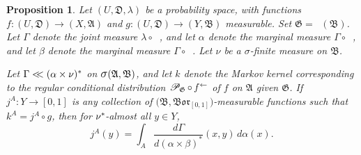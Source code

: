 \documentclass[
twoside=true,
paper=letter,
fontsize=9pt,
pagesize=auto,
leqno,
openany,
headsepline,
overfullrule,
]{scrbook}
\theoremstyle{plain}
\theoremstyle{plain}
\newtheorem{prop}[thm]{Proposition}
\theoremstyle{definition}
\theoremstyle{bfnoteitalic}
\theoremstyle{bfnoteroman}
\newcommand{\sigalg}[1]{\mathfrak{#1}}
\newcommand{\cali}[1]{\mathscr{#1}}
\newcommand{\condprobop}[1]{\mathop{\cali{P}\hspace{-1pt}}\nolimits_{#1}}
\newcommand{\borel}{\mathfrak{Bor}}
\newcommand{\sagb}{\mathop{\hbox{\large{$\sigma$}}}\nolimits}
\newcommand{\textsigma}{\hbox{\large{$\sigma$}}\kern-1pt}
\newcommand{\preimage}[1]{\mathop{#1^{\leftarrow}}}
\newcommand{\sigmaalgebra}{\sigalg{A}}
\newcommand{\sigmaalgebraii}{\sigalg{B}}
\newcommand{\productsig}[2]{\sagb(#1,#2)}
\newcommand{\kernast}{\ast\kern-1pt}
\newcommand{\funcf}{f}
\newcommand{\funcg}{g}
\newcommand{\funcj}{j}
\newcommand{\funck}{k}
\newcommand{\measurespace}{X}
\newcommand{\measurespaceii}{Y}
\newcommand{\mspaceelt}{x}
\newcommand{\mspaceeltii}{y}
\newcommand{\abscont}{\mathrel{< \kern-3.5pt <}}
\newcommand{\measnu}{\nu}
\newcommand{\measlambda}{\lambda}
\newcommand{\seti}{A}
\newcommand{\projectionone}{\pi_1}
\newcommand{\projectiontwo}{\pi_2}
\newcommand{\uspace}{U}%
\newcommand{\uspacesig}{\sigalg{D}}
\newcommand{\measonprod}{\Gamma}%
\newcommand{\marginalone}{\alpha}%
\newcommand{\marginaltwo}{\beta}%
\begin{document}
\begin{prop}\label{mixed_implies_bayes}
Let
$(\uspace, \uspacesig, \measlambda)$
be a probability space, with functions
$\funcf:(\uspace,\uspacesig)\to (\measurespace,\sigmaalgebra)$
and
$\funcg:(\uspace,\uspacesig)\to (\measurespaceii,\sigmaalgebraii)$
measurable.
Set
$\sigalg{G} = \preimage{\funcg}(\sigmaalgebraii)$.
Let $\measonprod$ denote the joint measure
$\measlambda\circ\preimage{({\funcf,\funcg})}$,
and let $\marginalone$  denote the marginal measure $\measonprod\circ \preimage{\projectionone}$,
and let $\marginaltwo$ denote the marginal measure $\measonprod\circ \preimage{\projectiontwo}$.
Let $\measnu$ be a \textsigma\hyp{}finite measure on $\sigmaalgebraii$.

Let
$\measonprod \abscont (\marginalone\times\measnu)^*$
on
$\productsig{\sigmaalgebra}{\sigmaalgebraii}$,
and let $\funck$ denote the Markov kernel corresponding to the regular conditional distribution
$\condprobop{\sigalg{G}}\circ \preimage{\funcf}$ of $\funcf$ on
$\sigmaalgebra$ given $\sigalg{G}$.
If
$\funcj^\seti : \measurespaceii \to [0,1]$
is any collection of
$\bigl( \sigmaalgebraii,\borel_{[0,1]} \bigr)$\hyp{}measurable
functions such that
$\funck^\seti = \funcj^\seti \circ \funcg$,
then for $\measnu^\kernast$\hyp{}almost all $\mspaceeltii\in\measurespaceii$,
\[
\funcj^\seti(\mspaceeltii)
=
\int_\seti
\dfrac{d\measonprod}{d(\marginalone\times\marginaltwo)^*}
(\mspaceelt,\mspaceeltii)\, d\marginalone(\mspaceelt).
\]
\end{prop}
\end{document}
